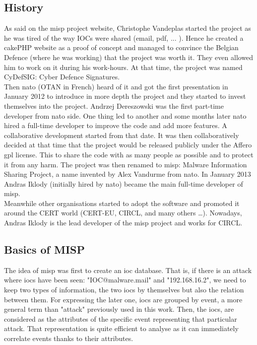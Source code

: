 \documentclass{eplmastersthesis}
\begin{document}
\subsection{History}
As said on the \gls{misp} project website, Christophe Vandeplas started the project as he was tired of the way IOCs were shared (email, pdf, ... ). Hence he created a cakePHP website as a proof of concept and managed to convince the Belgian Defence (where he was working) that the project was worth it. They even allowed him to work on it during his work-hours. At that time, the project was named CyDefSIG: Cyber Defence Signatures.\\

Then \gls{nato} (OTAN in French) heard of it and got the first presentation in January 2012 to introduce in more depth the project and they started to invest themselves into the project. Andrzej Dereszowski was the first part-time developer from  \gls{nato} side.
One thing led to another and some months later  \gls{nato} hired a full-time developer to improve the code and add more features. A collaborative development started from that date. 
It was then collaboratively decided at that time that the project would be released publicly under the Affero \gls{gpl} license. This to share the code with as many people as possible and to protect it from any harm.
The project was then renamed to \gls{misp}: Malware Information Sharing Project, a name invented by Alex Vandurme from  \gls{nato}.
In January 2013 Andras Iklody (initially hired by  \gls{nato}) became the main full-time developer of \gls{misp}.\\

Meanwhile other organisations started to adopt the software and promoted it around the CERT world (CERT-EU, CIRCL, and many others …). Nowadays, Andras Iklody is the lead developer of the \gls{misp} project and works for CIRCL.\\

\subsection{Basics of MISP}
The idea of \gls{misp} was first to create an \gls{ioc} database. That is, if there is an attack where \glspl{ioc} have been seen: "IOC@malware.mail" and "192.168.16.2", we need to keep two types of information, the two \glspl{ioc} by themselves but also the relation between them. For expressing the later one, \glspl{ioc} are grouped by event, a more general term than "attack" previously used in this work.  Then, the \glspl{ioc}, are considered as the attributes of the specific event representing that particular attack.
That representation is quite efficient to analyse as it can immediately correlate events thanks to their attributes.\\
\end{document}
